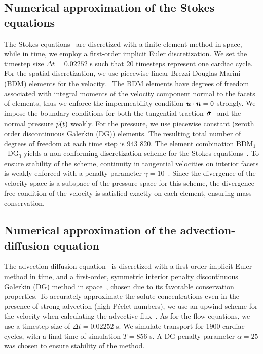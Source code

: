 \documentclass{WileyMSP-template}
\begin{document}
\subsection{Numerical approximation of the Stokes equations}
The Stokes equations~ are discretized with a finite element method
in space, while in time, we employ a first-order implicit Euler discretization.
We set the timestep size $\Delta t = 0.02252$ s such that 20 timesteps represent one cardiac cycle.
For the spatial discretization, we use piecewise linear Brezzi-Douglas-Marini (BDM)
elements for the velocity.~\cite{Brezzi1985TwoProblems, Nedelec1986AIR3}
The BDM elements have degrees of freedom associated with integral moments of the
velocity component normal to the facets of elements,
thus we enforce the impermeability condition $\bm{u}\cdot\bm{n}=0$ strongly.
We impose the boundary conditions for both the tangential traction $\hat{\bm{\sigma}}_{\parallel}$ and
the normal pressure $\Tilde{p}(t)$ weakly.
For the pressure, we use piecewise constant (zeroth order discontinuous Galerkin (DG)) elements.
The resulting total number of degrees of freedom at each time step is 943 820.
The element combination $\mathrm{BDM}_1$--$\mathrm{DG}_{0}$ yields a non-conforming
discretization scheme for the Stokes equations~\cite{Stenberg1989SomeEquations}.
To ensure stability of the scheme, continuity in tangential velocities on interior facets
is weakly enforced with a penalty parameter $\gamma=10$~\cite{Hong2016AEquations}.
Since the divergence of the velocity space is a subspace of the pressure space for this scheme,
the divergence-free condition of the velocity is satisfied exactly on each
element, ensuring mass conservation.~\cite{Boffi2008FiniteProblem} 

\subsection{Numerical approximation of the advection-diffusion equation}
The advection-diffusion equation~ is discretized
with a first-order implicit Euler method in time, and a first-order,
symmetric interior penalty discontinuous Galerkin (DG)
method in space~\cite{Arnold1982AnElements}, chosen due to its favorable
conservation properties.
To accurately approximate the solute concentrations even
in the presence of strong advection (high Péclet numbers),
we use an upwind scheme for the velocity when calculating the
advective flux~\cite{Patankar2018NumericalFlow}.
As for the flow equations, we use a timestep size of
$\Delta t = 0.02252$ s. We simulate transport for 1900 cardiac cycles,
with a final time of simulation $T = 856$ s.
A DG penalty parameter $\alpha = 25$ was chosen to ensure stability of the method. 
\end{document}
